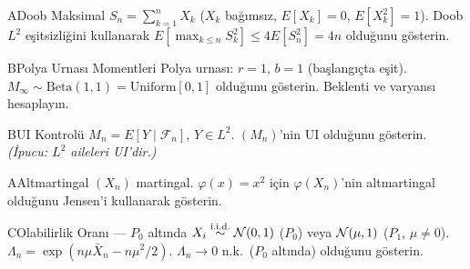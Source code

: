 
\alistirmalar

\begin{alistirma}[Al.9.3]{A}{Doob Maksimal}
$S_n = \sum_{k=1}^n X_k$ ($X_k$ bağımsız, $E[X_k]=0$, $E[X_k^2]=1$). Doob $L^2$ eşitsizliğini kullanarak $E[\max_{k\leq n}S_k^2]\leq 4E[S_n^2]=4n$ olduğunu gösterin.
\end{alistirma}

\begin{alistirma}[Al.9.4b]{B}{Polya Urnası Momentleri}
Polya urnası: $r=1$, $b=1$ (başlangıçta eşit). $M_\infty\sim\mathrm{Beta}(1,1)=\mathrm{Uniform}[0,1]$ olduğunu gösterin. Beklenti ve varyansı hesaplayın.
\end{alistirma}

\begin{alistirma}[Al.9.5b]{B}{UI Kontrolü}
$M_n = E[Y\mid\mathcal{F}_n]$, $Y\in L^2$. $(M_n)$'nin UI olduğunu gösterin. \textit{(İpucu: $L^2$ aileleri UI'dir.)}
\end{alistirma}

\begin{alistirma}[Al.9.3]{A}{Altmartingal}
$(X_n)$ martingal. $\varphi(x) = x^2$ için $\varphi(X_n)$'nin altmartingal
olduğunu Jensen'i kullanarak gösterin.
\end{alistirma}

\begin{alistirma}[Al.9.6]{C}{Olabilirlik Oranı --- $P_0$ altında}
$X_i\overset{\text{i.i.d.}}{\sim}\mathcal{N}(0,1)$ ($P_0$) veya $\mathcal{N}(\mu,1)$ ($P_1$, $\mu\neq0$). $\Lambda_n = \exp(n\mu\bar{X}_n - n\mu^2/2)$. $\Lambda_n\to0$ n.k.\ ($P_0$ altında) olduğunu gösterin.
\end{alistirma}

